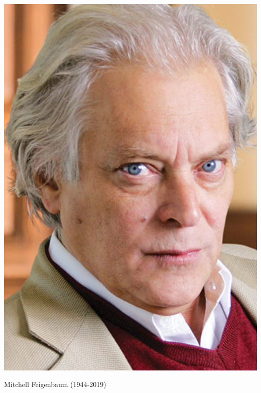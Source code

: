 \begin{marginfigure}[-10cm]
\includegraphics{dynamic/figures/m_feigenbaum}
\caption{Mitchell Feigenbaum (1944-2019)}
\end{marginfigure}

